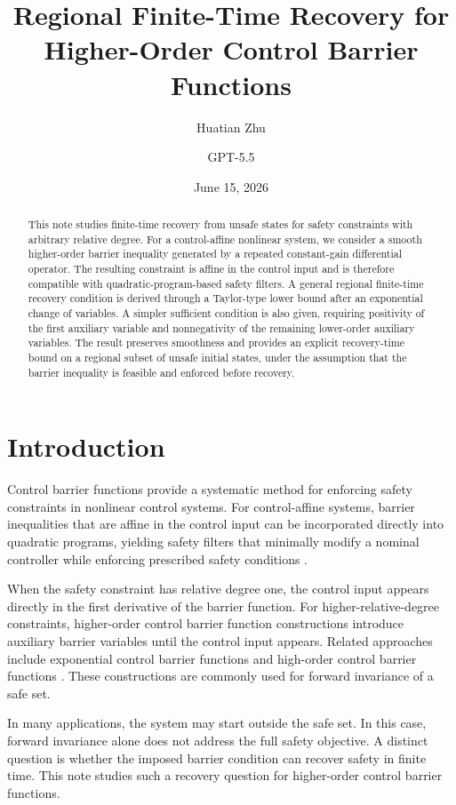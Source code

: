 \documentclass[11pt]{article}
\title{Regional Finite-Time Recovery for Higher-Order Control Barrier Functions}
\author{Huatian Zhu \and GPT-5.5}
\date{June 15, 2026}
\begin{document}
\maketitle

\begin{abstract}
This note studies finite-time recovery from unsafe states for safety constraints with arbitrary relative degree. For a control-affine nonlinear system, we consider a smooth higher-order barrier inequality generated by a repeated constant-gain differential operator. The resulting constraint is affine in the control input and is therefore compatible with quadratic-program-based safety filters. A general regional finite-time recovery condition is derived through a Taylor-type lower bound after an exponential change of variables. A simpler sufficient condition is also given, requiring positivity of the first auxiliary variable and nonnegativity of the remaining lower-order auxiliary variables. The result preserves smoothness and provides an explicit recovery-time bound on a regional subset of unsafe initial states, under the assumption that the barrier inequality is feasible and enforced before recovery.
\end{abstract}

\section{Introduction}

Control barrier functions provide a systematic method for enforcing safety constraints in nonlinear control systems. For control-affine systems, barrier inequalities that are affine in the control input can be incorporated directly into quadratic programs, yielding safety filters that minimally modify a nominal controller while enforcing prescribed safety conditions \cite{ames2014control,ames2019control}.

When the safety constraint has relative degree one, the control input appears directly in the first derivative of the barrier function. For higher-relative-degree constraints, higher-order control barrier function constructions introduce auxiliary barrier variables until the control input appears. Related approaches include exponential control barrier functions and high-order control barrier functions \cite{nguyen2016exponential,xiao2019control}. These constructions are commonly used for forward invariance of a safe set.

In many applications, the system may start outside the safe set. In this case, forward invariance alone does not address the full safety objective. A distinct question is whether the imposed barrier condition can recover safety in finite time. This note studies such a recovery question for higher-order control barrier functions.
\end{document}

